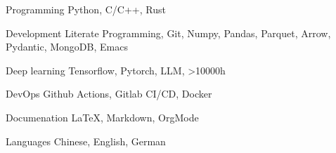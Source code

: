 \documentclass[../cv.tex]{subfiles}
\begin{document}


\begin{cvskills}

  \cvskill
    {Programming} %
    {Python, C/C++, Rust} %

  \cvskill
    {Development} %
    {Literate Programming, Git, Numpy, Pandas, Parquet, Arrow, Pydantic, MongoDB, Emacs} %


  \cvskill
    {Deep learning} %
    {Tensorflow, Pytorch, LLM, >10000h} %

  \cvskill
    {DevOps} %
    {Github Actions, Gitlab CI/CD, Docker} %

  \cvskill
    {Documenation} %
    {LaTeX, Markdown, OrgMode} %

  \cvskill
    {Languages} %
    {Chinese, English, German} %

\end{cvskills}
\end{document}
